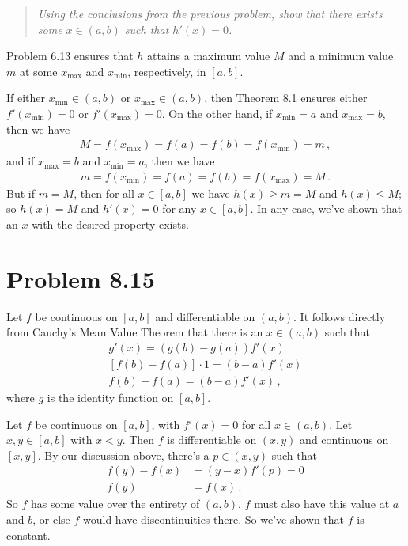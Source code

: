 \documentclass{article}
\begin{document}
\begin{quote}
    \itshape
    Using the conclusions from the previous problem, show that there exists
    some $x \in (a,b)$ such that $h'(x) = 0$.
\end{quote}

Problem 6.13 ensures that $h$ attains a maximum value $M$ and a minimum value $m$
at some $x_{\text{max}}$ and $x_{\text{min}}$, respectively, in $[a,b]$.

If either $x_{\text{min}} \in (a,b)$ or $x_{\text{max}} \in (a,b)$, then
Theorem 8.1 ensures either $f'(x_{\text{min}}) = 0$ or $f'(x_{\text{max}}) = 0$.
On the other hand, if $x_{\text{min}} = a$ and $x_{\text{max}} = b$, then we have
\begin{align*}
    M = f(x_{\text{max}}) = f(a) = f(b) = f(x_{\text{min}}) = m \,,
\end{align*}
and if $x_{\text{max}} = b$ and $x_{\text{min}} = a$, then we have
\begin{align*}
    m = f(x_{\text{min}}) = f(a) = f(b) = f(x_{\text{max}}) = M \,.
\end{align*}
But if $m = M$, then for all $x \in [a,b]$ we have
$h(x) \geq m = M$ and $h(x) \leq M$; so $h(x) = M$ and $h'(x) = 0$ for any $x \in [a,b]$.
In any case, we've shown that an $x$ with the desired property exists.

\qedsymbol

\section*{Problem 8.15}

Let $f$ be continuous on $[a,b]$ and differentiable on $(a,b)$.
It follows directly from Cauchy's Mean Value Theorem
that there is an $x \in (a,b)$ such that
\begin{align*}
    [f(b) - f(a)]g'(x) = (g(b)-g(a)) f'(x) \\
    [f(b) - f(a)]\cdot 1 = (b-a) f'(x) \\
    f(b) - f(a) = (b-a) f'(x) \,,
\end{align*}
where $g$ is the identity function on $[a,b]$.

Let $f$ be continuous on $[a,b]$, with $f'(x) = 0$ for all $x \in (a,b)$.
Let $x, y \in [a,b]$ with $x < y$. Then $f$ is differentiable on $(x,y)$ and
continuous on $[x,y]$.
By our discussion above, there's a $p \in (x,y)$ such that
\begin{align*}
    f(y) - f(x) &= (y-x)f'(p) = 0 \\
    f(y) &= f(x) \,.
\end{align*}
So $f$ has some value over the entirety of $(a,b)$.
$f$ must also have this value at $a$ and $b$, or else
$f$ would have discontinuities
there. So we've shown that $f$ is constant.
\end{document}
